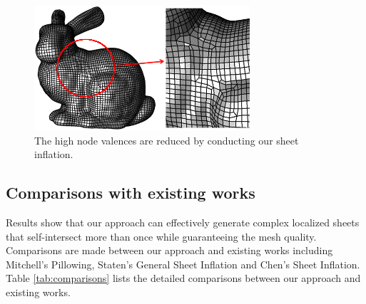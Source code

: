 \documentclass[final,5p,times,twocolumn]{elsarticle}
\begin{document}
\begin{figure}[htbp]
\begin{center}
\includegraphics[width=8cm]{rev_figures/bunny_result.png}
\caption{The high node valences are reduced by conducting our sheet inflation.}
\label{fig:bunny_result}
\end{center}
\end{figure}

\subsection{Comparisons with existing works}
\label{sec:comparisons}
Results show that our approach can effectively generate complex localized sheets that self-intersect more than once while guaranteeing the mesh quality. Comparisons are made between our approach and existing works including Mitchell's Pillowing\cite{Mitchell:1995wa}, Staten's General Sheet Inflation\cite{Staten:2009bo} and Chen's Sheet Inflation\cite{Chen:2015kf}. Table \ref{tab:comparisons} lists the detailed comparisons between our approach and existing works.
\end{document}
